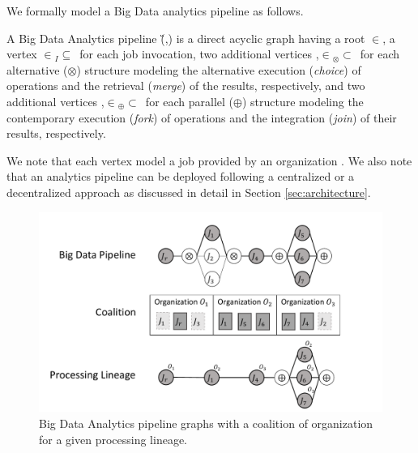 We formally model a Big Data analytics pipeline as follows.

\begin{definition} \label{def:pipeline}
    A Big Data Analytics pipeline \G(\V,\E) is a direct acyclic graph having a root $\in$\V, a vertex $\in$\V$_I$$\subseteq$\V\ for each job  invocation, two additional vertices ,$\in$\V$_{\otimes}$$\subset$\V\ for each alternative ($\otimes$) structure modeling the alternative execution (\emph{choice}) of operations and the retrieval (\emph{merge}) of the results, respectively, and two additional vertices ,$\in$\V$_{\oplus}$$\subset$\V\ for each parallel ($\oplus$) structure modeling the contemporary execution (\emph{fork}) of operations and the integration (\emph{join}) of their results, respectively.
\end{definition}

We note that each vertex  model a job  provided by an organization . We also note that an analytics pipeline can be deployed following a centralized or a decentralized approach as discussed in detail in Section \ref{sec:architecture}.

\begin{figure}[!t]
    \includegraphics[width=0.98\columnwidth]{generaleFig1.pdf}
    \caption{Big Data Analytics pipeline graphs with a coalition of organization for a given processing lineage.}\label{fig:BDpipeline}
\end{figure}

